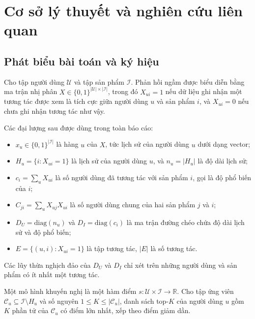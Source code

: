 \section{Cơ sở lý thuyết và nghiên cứu liên quan}
\label{sec:background}

\subsection{Phát biểu bài toán và ký hiệu}
\label{sec:notation}

\begin{dn}
\label{def:implicit}
Cho tập người dùng $\mathcal{U}$ và tập sản phẩm $\mathcal{I}$. Phản hồi ngầm được biểu diễn bằng ma trận nhị phân $X\in\{0,1\}^{|\mathcal{U}|\times|\mathcal{I}|}$, trong đó $X_{ui}=1$ nếu dữ liệu ghi nhận một tương tác được xem là tích cực giữa người dùng $u$ và sản phẩm $i$, và $X_{ui}=0$ nếu chưa ghi nhận tương tác như vậy.
\end{dn}

Các đại lượng sau được dùng trong toàn báo cáo:
\begin{itemize}
\item $x_u\in\{0,1\}^{|\mathcal{I}|}$ là hàng $u$ của $X$, tức lịch sử của người dùng $u$ dưới dạng vector;
\item $H_u=\{i: X_{ui}=1\}$ là lịch sử của người dùng $u$, và $n_u=|H_u|$ là độ dài lịch sử;
\item $c_i=\sum_{u}X_{ui}$ là số người dùng đã tương tác với sản phẩm $i$, gọi là độ phổ biến của $i$;
\item $C_{ji}=\sum_u X_{uj}X_{ui}$ là số người dùng chung của hai sản phẩm $j$ và $i$;
\item $D_U=\mathrm{diag}(n_u)$ và $D_I=\mathrm{diag}(c_i)$ là ma trận đường chéo chứa độ dài lịch sử và độ phổ biến;
\item $E=\{(u,i): X_{ui}=1\}$ là tập tương tác, $|E|$ là số tương tác.
\end{itemize}
Các lũy thừa nghịch đảo của $D_U$ và $D_I$ chỉ xét trên những người dùng và sản phẩm có ít nhất một tương tác.

\begin{dn}
\label{def:topk}
Một mô hình khuyến nghị là một hàm điểm $s:\mathcal{U}\times\mathcal{I}\to\mathbb{R}$. Cho tập ứng viên $\mathcal{C}_u\subseteq\mathcal{I}\setminus H_u$ và số nguyên $1\le K\le|\mathcal{C}_u|$, danh sách top-$K$ của người dùng $u$ gồm $K$ phần tử của $\mathcal{C}_u$ có điểm lớn nhất, xếp theo điểm giảm dần.
\end{dn}


